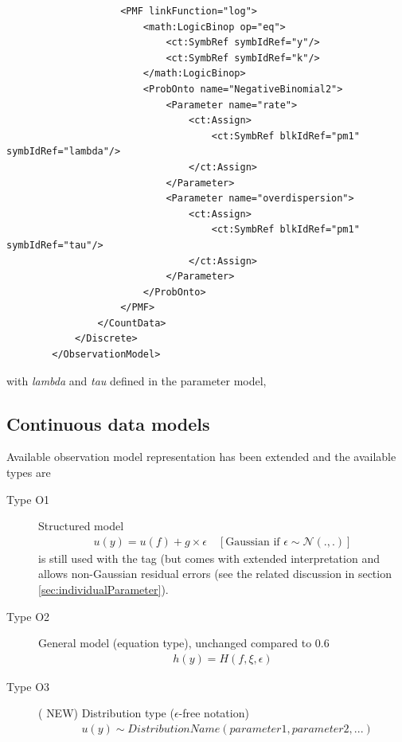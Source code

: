 \begin{itemize}
\begin{lstlisting}
                    <PMF linkFunction="log">
                        <math:LogicBinop op="eq">
                            <ct:SymbRef symbIdRef="y"/>
                            <ct:SymbRef symbIdRef="k"/>
                        </math:LogicBinop>
                        <ProbOnto name="NegativeBinomial2">
                            <Parameter name="rate">
                                <ct:Assign>
                                    <ct:SymbRef blkIdRef="pm1" symbIdRef="lambda"/>
                                </ct:Assign>
                            </Parameter>
                            <Parameter name="overdispersion">
                                <ct:Assign>
                                    <ct:SymbRef blkIdRef="pm1" symbIdRef="tau"/>
                                </ct:Assign>
                            </Parameter>
                        </ProbOnto>
                    </PMF>
                </CountData>
            </Discrete>
        </ObservationModel>
\end{lstlisting}
with \emph{lambda} and \emph{tau} defined in the parameter model, 
\end{itemize}


\subsection{Continuous data models}
\label{subsec:contModels}
Available observation model representation has been extended and the available types are
\begin{description} 
\item[Type O1] Structured model 
\begin{align*}
	u(y) = u(f) + g \times \epsilon \quad [\text{Gaussian if } \epsilon \sim \mathcal N(.,.)]
\end{align*}
is still used with the  tag (but comes with extended interpretation 
and allows non-Gaussian residual errors (see the related discussion in section 
\ref{sec:individualParameter}).
\item[Type O2] General model (equation type), unchanged compared to 0.6
\begin{align*}
	h(y) = H(f, \xi, \epsilon)
\end{align*}

\item[Type O3] ({\color{red} \scshape{NEW}}) Distribution type ($\epsilon$-free notation) 
\begin{align*}
	& u(y)  \sim DistributionName(parameter1, parameter2, ...)
\end{align*}

\end{description}

